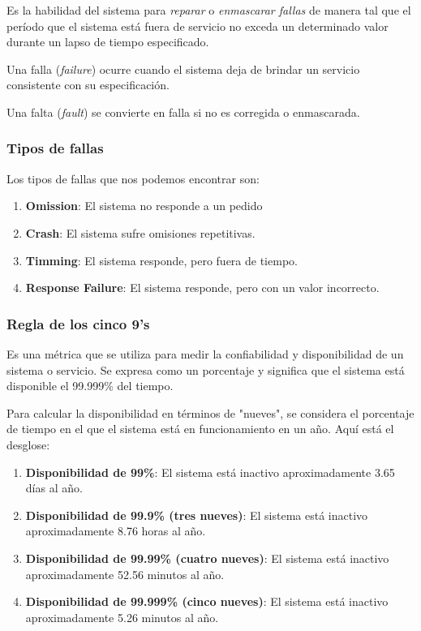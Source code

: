 \documentclass{article}
\begin{document}
			Es la habilidad del sistema para \textit{reparar} o \textit{enmascarar fallas} de manera tal que el período que el sistema está fuera de servicio no exceda un determinado valor durante un lapso de tiempo especificado.
			
			Una falla (\textit{failure}) ocurre cuando el sistema deja de brindar un servicio consistente con su especificación. 
			
			Una falta (\textit{fault}) se convierte en falla si no es corregida o enmascarada.
			
		\subsubsection{Tipos de fallas}
		
			Los tipos de fallas que nos podemos encontrar son: 
		
			\begin{enumerate}
				\item \textbf{Omission}: El sistema no responde a un pedido
				
				\item \textbf{Crash}: El sistema sufre omisiones repetitivas.
				
				\item \textbf{Timming}: El sistema responde, pero fuera de tiempo.
				
				\item  \textbf{Response Failure}: El sistema responde, pero con un valor incorrecto.
				
			\end{enumerate}
			
		\subsubsection{Regla de los cinco 9's}\label{sec:regla_nueves}
		Es una métrica que se utiliza para medir la confiabilidad y disponibilidad de un sistema o servicio. Se expresa como un porcentaje y significa que el sistema está disponible el 99.999\% del tiempo.
		
		Para calcular la disponibilidad en términos de "nueves", se considera el porcentaje de tiempo en el que el sistema está en funcionamiento en un año. Aquí está el desglose:
		\begin{enumerate}
			\item \textbf{Disponibilidad de 99\%}: El sistema está inactivo aproximadamente 3.65 días al año.
			
			\item \textbf{Disponibilidad de 99.9\% (tres nueves)}: El sistema está inactivo aproximadamente 8.76 horas al año.
			
			\item \textbf{Disponibilidad de 99.99\% (cuatro nueves)}:  El sistema está inactivo aproximadamente 52.56 minutos al año.
			
			\item  \textbf{Disponibilidad de 99.999\% (cinco nueves)}: El sistema está inactivo aproximadamente 5.26 minutos al año.
			
		\end{enumerate}
		
\end{document}
